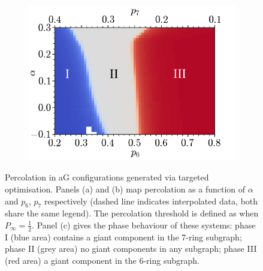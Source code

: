 \begin{figure}[bt]
      \begin{subfigure}[b]{0.5\textwidth}
         \centering
         \includegraphics[width=\textwidth]{./figures/targeted_opt/perc3.pdf}
         \caption{}
         \label{fig:percres3}
     \end{subfigure}
     \hfill
     
     \caption{Percolation in aG configurations generated via targeted optimisation. Panels (a) and (b) map percolation as a function of $\alpha$ and $p_6$, $p_7$ respectively (dashed line indicates interpolated data, both share the same legend). The percolation threshold is defined as when $P_\infty=\frac{1}{2}$. Panel (c) gives the phase behaviour of these systems: phase I (blue area) contains a giant component in the 7\--ring subgraph; phase II (grey area) no giant components in any subgraph; phase III (red area) a giant component in the 6\--ring subgraph.}
     \label{fig:percolationres}
\end{figure}


